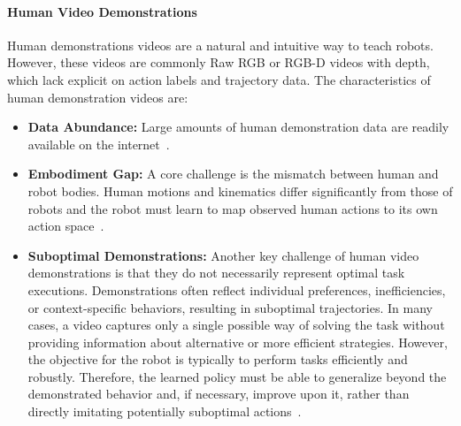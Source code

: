 \paragraph{Human Video Demonstrations}
Human demonstrations videos are a natural and intuitive way to teach robots.  However, these videos are commonly Raw RGB or RGB-D videos with depth, which lack explicit on action labels and trajectory data. 
The characteristics of human demonstration videos are:
\begin{itemize}
	\item \textbf{Data Abundance:} Large amounts of human demonstration data are readily available on the internet~\cite{McCarthy_2025, Eze2024LearningBW}. 
	\item \textbf{Embodiment Gap:} A core challenge is the mismatch between human and robot bodies. Human motions and kinematics differ significantly from those of robots and the robot must learn to map observed human actions to its own action space~\cite{McCarthy_2025}.
	\item \textbf{Suboptimal Demonstrations:} Another key challenge of human video demonstrations is that they do not necessarily represent optimal task executions. Demonstrations often reflect individual preferences, inefficiencies, or context-specific behaviors, resulting in suboptimal trajectories. In many cases, a video captures only a single possible way of solving the task without providing information about alternative or more efficient strategies. However, the objective for the robot is typically to perform tasks efficiently and robustly. Therefore, the learned policy must be able to generalize beyond the demonstrated behavior and, if necessary, improve upon it, rather than directly imitating potentially suboptimal actions~\cite{McCarthy_2025}.
\end{itemize}






